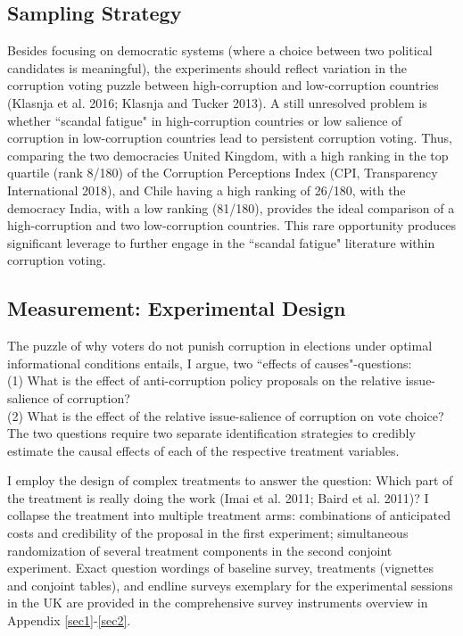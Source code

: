 \documentclass[11pt]{article}
\begin{document}
\subsection{Sampling Strategy}
Besides focusing on democratic systems (where a choice between two political candidates is meaningful), the experiments should reflect variation in the corruption voting puzzle between high-corruption and low-corruption countries (Klasnja et al. 2016; Klasnja and Tucker 2013). A still unresolved problem is whether ``scandal fatigue" in high-corruption countries or low salience of corruption in low-corruption countries lead to persistent corruption voting. Thus, comparing the two democracies United Kingdom, with a high ranking in the top quartile (rank 8/180) of the Corruption Perceptions Index (CPI, Transparency International 2018), and Chile having a high ranking of 26/180, with the democracy India, with a low ranking (81/180), provides the ideal comparison of a high-corruption and two low-corruption countries. This rare opportunity produces significant leverage to further engage in the ``scandal fatigue" literature within corruption voting.

\subsection{Measurement: Experimental Design}
The puzzle of why voters do not punish corruption in elections under optimal informational conditions entails, I argue, two “effects of causes"-questions: \\
(1) What is the effect of anti-corruption policy proposals on the relative issue-salience of corruption?\\
(2) What is the effect of the relative issue-salience of corruption on vote choice?\\
The two questions require two separate identification strategies to credibly estimate the causal effects of each of the respective treatment variables.

I employ the design of complex treatments to answer the question: Which part of the treatment is really doing the work (Imai et al. 2011; Baird et al. 2011)? I collapse the treatment into multiple treatment arms: combinations of anticipated costs and credibility of the proposal in the first experiment; simultaneous randomization of several treatment components in the second conjoint experiment. Exact question wordings of baseline survey, treatments (vignettes and conjoint tables), and endline surveys exemplary for the experimental sessions in the UK are provided in the comprehensive survey instruments overview in Appendix \ref{sec1}-\ref{sec2}.
\end{document}
